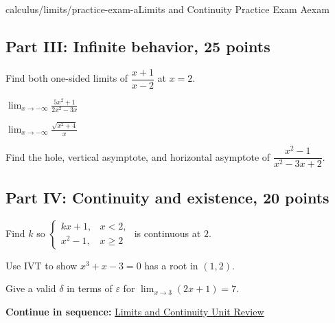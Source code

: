 \documentclass[11pt,openany]{book}
\theoremstyle{bgplain}
\newcommand{\webnext}[2]{%
  \par\addvspace{1.2em}\noindent{\color{BGLine}\rule{\textwidth}{0.35pt}}\par\smallskip
  {\small\color{BGGray}\textbf{Continue in sequence:} \hyperlink{web:#1}{#2}}\par
}
\newcommand{\eps}{\varepsilon}
\begin{document}
\begin{webpage}{calculus/limits/practice-exam-a}{Limits and Continuity Practice Exam A}{exam}
\subsection*{Part III: Infinite behavior, 25 points}
\begin{bgexercises}[label=\textbf{A\arabic*.},resume]
  \item Find both one-sided limits of \(\dfrac{x+1}{x-2}\) at \(x=2\).
  \item \(\displaystyle\lim_{x\to-\infty}\frac{5x^2+1}{2x^2-3x}\)
  \item \(\displaystyle\lim_{x\to-\infty}\frac{\sqrt{x^2+4}}x\)
  \item Find the hole, vertical asymptote, and horizontal asymptote of \(\dfrac{x^2-1}{x^2-3x+2}\).
\end{bgexercises}

\subsection*{Part IV: Continuity and existence, 20 points}
\begin{bgexercises}[label=\textbf{A\arabic*.},resume]
  \item Find \(k\) so \(\begin{cases}kx+1,&x<2,\\x^2-1,&x\ge2\end{cases}\) is continuous at \(2\).
  \item Use IVT to show \(x^3+x-3=0\) has a root in \((1,2)\).
  \item Give a valid \(\delta\) in terms of \(\eps\) for \(\lim_{x\to3}(2x+1)=7\).
\end{bgexercises}
\webnext{calculus/limits/unit-review}{Limits and Continuity Unit Review}
\end{webpage}
\end{document}
